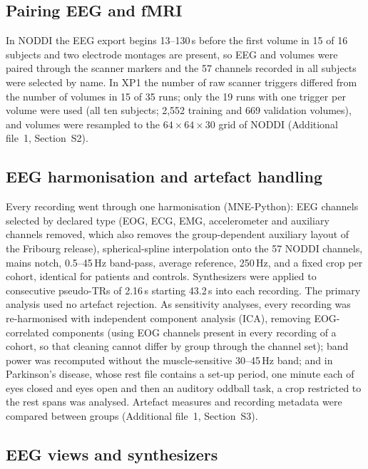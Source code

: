 \documentclass[pdflatex,referee,sn-basic]{sn-jnl}%
\begin{document}
\subsection{Pairing EEG and fMRI}\label{section:fmri_data}

In NODDI the EEG export begins 13--130\,s before the first volume in 15 of 16 subjects and two electrode montages are present, so EEG and volumes were paired through the scanner markers and the 57 channels recorded in all subjects were selected by name. In XP1 the number of raw scanner triggers differed from the number of volumes in 15 of 35 runs; only the 19 runs with one trigger per volume were used (all ten subjects; 2,552 training and 669 validation volumes), and volumes were resampled to the $64\times64\times30$ grid of NODDI (Additional file~1, Section~S2).

\subsection{EEG harmonisation and artefact handling}\label{section:adaptation}

Every recording went through one harmonisation (MNE-Python): EEG channels selected by declared type (EOG, ECG, EMG, accelerometer and auxiliary channels removed, which also removes the group-dependent auxiliary layout of the Fribourg release), spherical-spline interpolation onto the 57 NODDI channels, mains notch, 0.5--45\,Hz band-pass, average reference, 250\,Hz, and a fixed crop per cohort, identical for patients and controls. Synthesizers were applied to consecutive pseudo-TRs of 2.16\,s starting 43.2\,s into each recording. The primary analysis used no artefact rejection. As sensitivity analyses, every recording was re-harmonised with independent component analysis (ICA), removing EOG-correlated components (using EOG channels present in every recording of a cohort, so that cleaning cannot differ by group through the channel set); band power was recomputed without the muscle-sensitive 30--45\,Hz band; and in Parkinson's disease, whose rest file contains a set-up period, one minute each of eyes closed and eyes open and then an auditory oddball task, a crop restricted to the rest spans was analysed. Artefact measures and recording metadata were compared between groups (Additional file~1, Section~S3).

\subsection{EEG views and synthesizers}\label{eeg_views:eeg_to_fmri}
\end{document}
